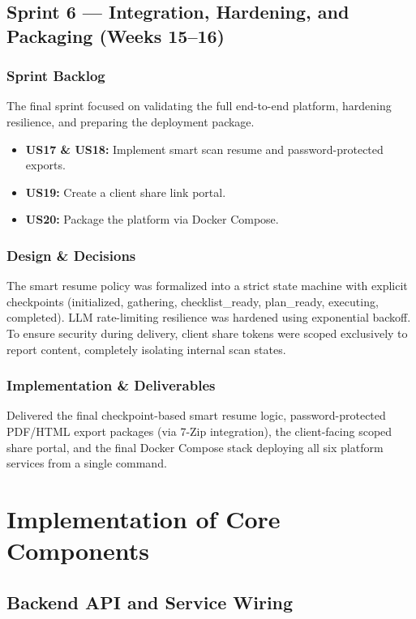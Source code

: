 \documentclass[12pt,a4paper]{report}
\begin{document}
\subsection{Sprint 6 --- Integration, Hardening, and Packaging (Weeks 15--16)}

\subsubsection{Sprint Backlog}
The final sprint focused on validating the full end-to-end platform, hardening resilience, and preparing the deployment package.
\begin{itemize}
    \item \textbf{US17 \& US18:} Implement smart scan resume and password-protected exports.
    \item \textbf{US19:} Create a client share link portal.
    \item \textbf{US20:} Package the platform via Docker Compose.
\end{itemize}

\subsubsection{Design \& Decisions}
The smart resume policy was formalized into a strict state machine with explicit checkpoints (initialized, gathering, checklist\_ready, plan\_ready, executing, completed). LLM rate-limiting resilience was hardened using exponential backoff. To ensure security during delivery, client share tokens were scoped exclusively to report content, completely isolating internal scan states.

\subsubsection{Implementation \& Deliverables}
Delivered the final checkpoint-based smart resume logic, password-protected PDF/HTML export packages (via 7-Zip integration), the client-facing scoped share portal, and the final Docker Compose stack deploying all six platform services from a single command.
\section{Implementation of Core Components}

\subsection{Backend API and Service Wiring}
\end{document}
